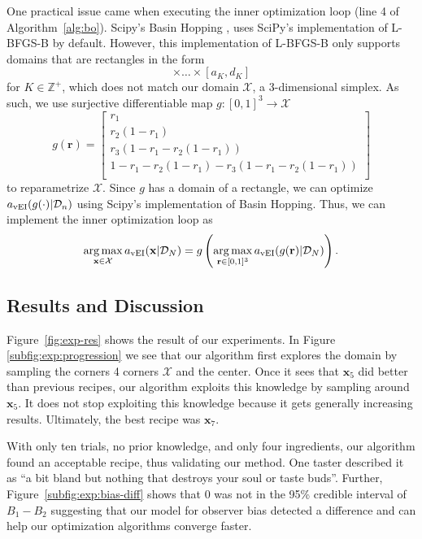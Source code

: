 One practical issue came when executing the inner optimization loop (line 4 of Algorithm~\ref{alg:bo}).
Scipy's Basin Hopping \cite{scipy, wales1997}, uses SciPy's implementation of L-BFGS-B by default.
However, this implementation of L-BFGS-B only supports domains that are rectangles in the form
\begin{equation*}
    [a_1, d_1] \times \ldots \times [a_K, d_K]
\end{equation*}
for $K \in \mathbb{Z}^{+}$,
which does not match our domain $\mathcal{X}$, a 3-dimensional simplex.
As such, we use surjective differentiable map $g: [0, 1]^3 \to \mathcal{X}$
\begin{equation*}
    g(\mathbf{r}) =
    \begin{bmatrix}
        r_1 \\
        r_2(1 - r_1) \\
        r_3(1 - r_1 - r_2(1 - r_1)) \\
           1 - r_1 - r_2(1 - r_1) - r_3(1 - r_1 - r_2(1 - r_1)) \\
    \end{bmatrix}
\end{equation*}
to reparametrize $\mathcal{X}$.
Since $g$ has a domain of a rectangle, we can optimize $a_{\mathrm{vEI}}(g(\cdot) | \mathcal{D}_n)$ using Scipy's implementation of Basin Hopping.
Thus, we can implement the inner optimization loop as
\begin{equation*}
    \operatorname*{arg\,max}_{\mathbf{x} \in \mathcal{X}} a_{\mathrm{vEI}}(\mathbf{x} | \mathcal{D}_N)
    =
    g\left(\operatorname*{arg\,max}_{\mathbf{r} \in [0, 1]^3} a_{\mathrm{vEI}}(g(\mathbf{r}) | \mathcal{D}_N)\right).
\end{equation*}

\subsection{Results and Discussion}\label{ssec:results}

Figure~\ref{fig:exp-res} shows the result of our experiments.
In Figure \ref{subfig:exp:progression} we see that our algorithm first explores the domain by sampling the corners 4 corners $\mathcal{X}$ and the center.
Once it sees that $\mathbf{x}_5$ did better than previous recipes, our algorithm exploits this knowledge by sampling around $\mathbf{x}_5$.
It does not stop exploiting this knowledge because it gets generally increasing results.
Ultimately, the best recipe was $\mathbf{x}_7$.

With only ten trials, no prior knowledge, and only four ingredients,
our algorithm found an acceptable recipe, thus validating our method.
One taster described it as ``a bit bland but nothing that destroys your soul or taste buds''.
Further, Figure~\ref{subfig:exp:bias-diff} shows that 0 was not in the 95\% credible interval of $B_1 - B_2$
suggesting that our model for observer bias detected a difference and can help our optimization algorithms converge faster.

